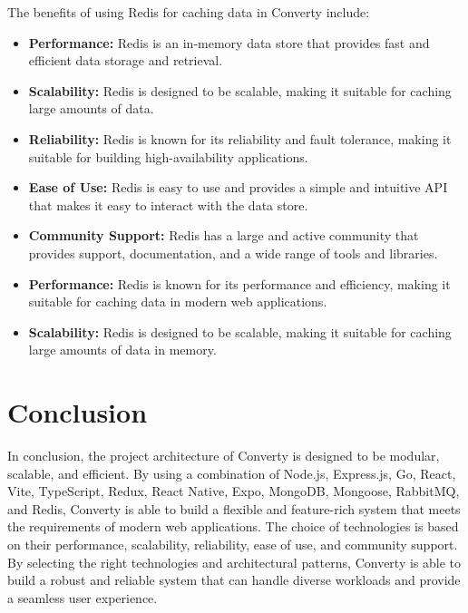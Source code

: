 The benefits of using Redis for caching data in Converty include:

\begin{itemize}
    \item \textbf{Performance:} Redis is an in-memory data store that provides fast and efficient data storage and retrieval.
    \item \textbf{Scalability:} Redis is designed to be scalable, making it suitable for caching large amounts of data.
    \item \textbf{Reliability:} Redis is known for its reliability and fault tolerance, making it suitable for building high-availability applications.
    \item \textbf{Ease of Use:} Redis is easy to use and provides a simple and intuitive API that makes it easy to interact with the data store.
    \item \textbf{Community Support:} Redis has a large and active community that provides support, documentation, and a wide range of tools and libraries.
    \item \textbf{Performance:} Redis is known for its performance and efficiency, making it suitable for caching data in modern web applications.
    \item \textbf{Scalability:} Redis is designed to be scalable, making it suitable for caching large amounts of data in memory.
\end{itemize}

\section{Conclusion}

In conclusion, the project architecture of Converty is designed to be modular, scalable, and efficient. By using a combination of Node.js, Express.js, Go, React, Vite, TypeScript, Redux, React Native, Expo, MongoDB, Mongoose, RabbitMQ, and Redis, Converty is able to build a flexible and feature-rich system that meets the requirements of modern web applications. The choice of technologies is based on their performance, scalability, reliability, ease of use, and community support. By selecting the right technologies and architectural patterns, Converty is able to build a robust and reliable system that can handle diverse workloads and provide a seamless user experience.